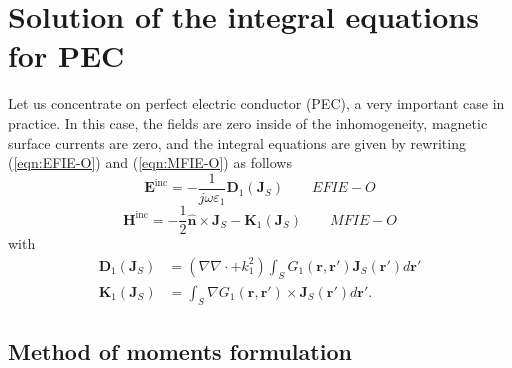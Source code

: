 \documentclass[a4paper,10pt]{book}
\newcommand{\field}[1]{\mathbf{#1}}
\newcommand{\current}[1]{\mathbf{#1}}
\newcommand{\vect}[1]{\mathbf{#1}}
\newcommand{\operator}[1]{\mathbf{#1}}
\renewcommand{\arg}[1]{\ensuremath{\!\left(#1\right)}}
\begin{document}
\chapter{Solution of the integral equations for PEC}
%
\par
Let us concentrate on perfect electric conductor (PEC), a very important case in practice. In this case, the fields are zero inside of the inhomogeneity, magnetic surface currents are zero, and the integral equations are given by rewriting (\ref{eqn:EFIE-O}) and (\ref{eqn:MFIE-O}) as follows
\begin{equation}\label{eqn:EFIE-O_PEC}
\boxed{
\field{E}^\text{inc} =  - \frac{1}{j \omega \varepsilon_1} \operator{D}_1 \left( \current{J}_{S}\right) 
} \qquad EFIE-O
\end{equation}
\begin{equation}\label{eqn:MFIE-O_PEC}
\boxed{
\field{H}^\text{inc} = - \frac{1}{2} \vect{\hat{n}} \times \current{J}_{S} - \operator{K}_1 \left(\current{J}_{S}\right)
} \qquad MFIE-O
\end{equation}
with
\begin{align*}
\operator{D}_1\arg{\current{J}_S} &= \left(\nabla \nabla \cdot + k_1^2\right) \int_{S} G_1\left(\vect{r}, \vect{r}'\right) \current{J}_S\left(\vect{r}'\right) d\vect{r}' \\
\operator{K}_1\left(\current{J}_S\right) &= \int_S \nabla G_1\left(\vect{r}, \vect{r}'\right) \times \current{J}_S\left(\vect{r}'\right) d\vect{r}'.
\end{align*}


\section{Method of moments formulation}
\end{document}
